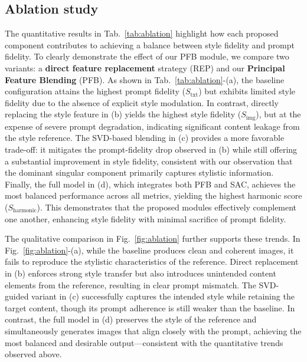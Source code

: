 \documentclass[10pt,twocolumn,letterpaper]{article}
\newcommand{\figref}[1]{Fig.~\ref{#1}}
\newcommand{\tabref}[1]{Tab.~\ref{#1}}
\begin{document}
\subsection{Ablation study}
\label{sec:ablation}

The quantitative results in \tabref{tab:ablation} highlight how each proposed component contributes to achieving a balance between style fidelity and prompt fidelity. To clearly demonstrate the effect of our PFB module, we compare two variants: a \textbf{direct feature replacement} strategy (REP) and our \textbf{Principal Feature Blending} (PFB).  As shown in \tabref{tab:ablation}-(a), the baseline configuration attains the highest prompt fidelity ($S_\text{txt}$) but exhibits limited style fidelity due to the absence of explicit style modulation. In contrast, directly replacing the style feature in (b) yields the highest style fidelity ($S_\text{img}$), but at the expense of severe prompt degradation, indicating significant content leakage from the style reference. The SVD-based blending in (c) provides a more favorable trade-off: it mitigates the prompt-fidelity drop observed in (b) while still offering a substantial improvement in style fidelity, consistent with our observation that the dominant singular component primarily captures stylistic information. Finally, the full model in (d), which integrates both PFB and SAC, achieves the most balanced performance across all metrics, yielding the highest harmonic score ($S_\text{harmonic}$). This demonstrates that the proposed modules effectively complement one another, enhancing style fidelity with minimal sacrifice of prompt fidelity.

The qualitative comparison in \figref{fig:ablation} further supports these trends. In \figref{fig:ablation}-(a), while the baseline produces clean and coherent images, it fails to reproduce the stylistic characteristics of the reference. Direct replacement in (b) enforces strong style transfer but also introduces unintended content elements from the reference, resulting in clear prompt mismatch. The SVD-guided variant in (c) successfully captures the intended style while retaining the target content, though its prompt adherence is still weaker than the baseline. In contrast, the full model in (d) preserves the style of the reference and simultaneously generates images that align closely with the prompt, achieving the most balanced and desirable output—consistent with the quantitative trends observed above.
\end{document}
